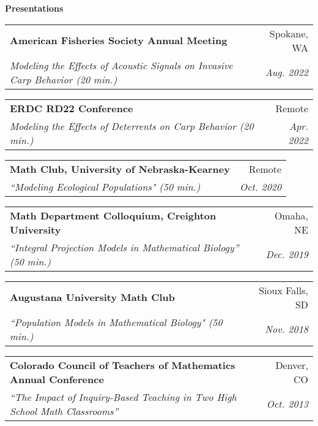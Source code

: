 \documentclass[letterpaper,11pt]{article}
\makeatletter
\newcommand{\resheading}[1]{{\large \colorbox{mygrey}{\begin{minipage}{\textwidth}{\textbf{#1 \vphantom{p\^{E}}}}\end{minipage}}}}
\newcommand{\ressubheading}[4]{
\begin{tabular*}{6.5in}{l@{\extracolsep{\fill}}r}
		\textbf{#1} & #2 \\
		\textit{#3} & \textit{#4} \\
\end{tabular*}\vspace{-6pt}}
\makeatother
\begin{document}
\resheading{Presentations}
\begin{etaremune}
	\item 
	\ressubheading{American Fisheries Society Annual Meeting}{Spokane, WA}{Modeling the Effects of Acoustic Signals on Invasive Carp Behavior (20 min.)}{Aug. 2022}
	\item
	\ressubheading{ERDC RD22 Conference}{Remote}{Modeling the Effects of Deterrents on Carp Behavior (20 min.)}{Apr. 2022}
	\item
	\ressubheading{Math Club, University of Nebraska-Kearney}{Remote}{``Modeling Ecological Populations" (50 min.)}{Oct. 2020}
	\item
	\ressubheading{Math Department Colloquium, Creighton University}{Omaha, NE}{``Integral Projection Models in Mathematical Biology'' (50 min.)}{Dec. 2019}
	\item
	\ressubheading{Augustana University Math Club}{Sioux Falls, SD}{``Population Models in Mathematical Biology" (50 min.)}{Nov. 2018}
	\item
	\ressubheading{Colorado Council of Teachers of Mathematics Annual Conference}{Denver, CO}{``The Impact of Inquiry-Based Teaching in Two High School Math Classrooms''}{Oct. 2013}
\end{etaremune}
	
\end{document}
